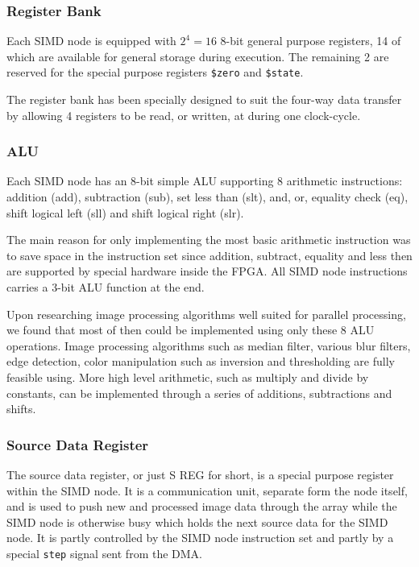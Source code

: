 \subsubsection{Register Bank}
Each \ac{SIMD} node is equipped with $2^4 = 16$ 8-bit general purpose registers, 14 of
which are available for general storage during execution. The remaining 2 are
reserved for the special purpose registers {\tt \$zero} and {\tt \$state}.



The register bank has been specially designed to suit the four-way data transfer by
allowing 4 registers to be read, or written, at during one clock-cycle.

\subsubsection{ALU}
Each \ac{SIMD} node has an 8-bit simple ALU supporting 8 arithmetic instructions: 
addition ({\sc add}), subtraction ({\sc sub}), set less than ({\sc slt}), {\sc and}, 
{\sc or}, equality check ({\sc eq}), shift logical left ({\sc sll}) and shift logical 
right ({\sc slr}). 

The main reason for only implementing the most basic arithmetic instruction was to save
space in the instruction set since addition, subtract, equality and less then are 
supported by special hardware inside the FPGA. All \ac{SIMD} node instructions carries
a 3-bit \ac{ALU} function at the end.

Upon researching image processing algorithms well suited for parallel processing, we
found that most of then could be implemented using only these 8 \ac{ALU} operations. 
Image processing algorithms such as median filter, various blur filters, edge detection, 
color manipulation such as inversion and thresholding are fully feasible using. More high
level arithmetic, such as multiply and divide by constants, can be implemented
through a series of additions, subtractions and shifts.


\subsubsection{Source Data Register}
The source data register, or just \ac{S REG} for short, is a special purpose
register within the \ac{SIMD} node. It is a communication unit, separate form
the node itself, and is used to push new and processed image data through the
array while the \ac{SIMD} node is otherwise busy  which holds the next source data for the \ac{SIMD} node. It is
partly controlled by the \ac{SIMD} node instruction set and partly by a special
{\tt step} signal sent from the \ac{DMA}.

